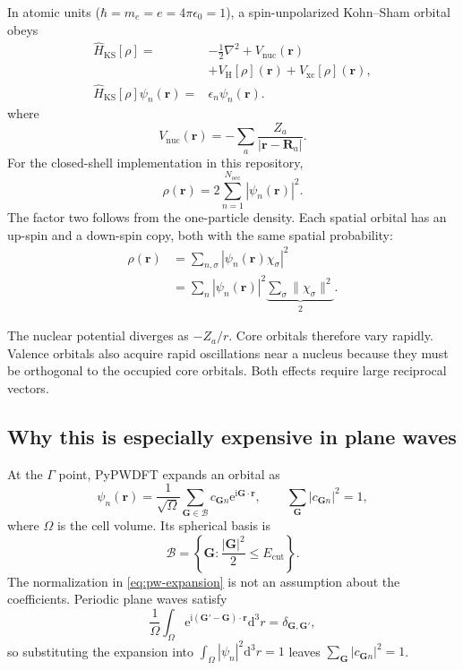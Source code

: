\documentclass[10pt,twocolumn]{article}
\newcommand{\ii}{\mathrm{i}}
\newcommand{\e}{\mathrm{e}}
\newcommand{\dd}{\mathrm{d}}
\newcommand{\gvec}{\mathbf G}
\newcommand{\rvec}{\mathbf r}
\newcommand{\Rvec}{\mathbf R}
\begin{document}
In atomic units (\(\hbar=m_e=e=4\pi\epsilon_0=1\)), a spin-unpolarized
Kohn--Sham orbital obeys
\begin{align}
\widehat H_{\mathrm{KS}}[\rho]
={}&-\frac{1}{2}\nabla^2+V_{\mathrm{nuc}}(\rvec)\nonumber\\
&+V_{\mathrm H}[\rho](\rvec)
+V_{\mathrm{xc}}[\rho](\rvec),\nonumber\\
\widehat H_{\mathrm{KS}}[\rho]\psi_n(\rvec)
={}&\epsilon_n\psi_n(\rvec).
\label{eq:ks-ae}
\end{align}
where
\begin{equation}
V_{\mathrm{nuc}}(\rvec)
=-\sum_a\frac{Z_a}{|\rvec-\Rvec_a|}.
\end{equation}
For the closed-shell implementation in this repository,
\begin{equation}
\rho(\rvec)=2\sum_{n=1}^{N_{\mathrm{occ}}}
|\psi_n(\rvec)|^2.
\end{equation}
The factor two follows from the one-particle density.  Each spatial orbital
has an up-spin and a down-spin copy, both with the same spatial probability:
\begin{align}
\rho(\rvec)
&=\sum_{n,\sigma}|\psi_n(\rvec)\chi_\sigma|^2\nonumber\\
&=\sum_n|\psi_n(\rvec)|^2
\underbrace{\sum_{\sigma}\|\chi_\sigma\|^2}_{2}.
\end{align}

The nuclear potential diverges as \(-Z_a/r\).  Core orbitals therefore vary
rapidly.  Valence orbitals also acquire rapid oscillations near a nucleus
because they must be orthogonal to the occupied core orbitals.  Both effects
require large reciprocal vectors.

\subsection{Why this is especially expensive in plane waves}

At the \(\Gamma\) point, PyPWDFT expands an orbital as
\begin{equation}
\psi_n(\rvec)=\frac{1}{\sqrt{\Omega}}
\sum_{\gvec\in\mathcal B}c_{\gvec n}\e^{\ii\gvec\cdot\rvec},
\qquad
\sum_{\gvec}|c_{\gvec n}|^2=1,
\label{eq:pw-expansion}
\end{equation}
where \(\Omega\) is the cell volume.  Its spherical basis is
\begin{equation}
\mathcal B=
\left\{\gvec:\frac{|\gvec|^2}{2}\le E_{\mathrm{cut}}\right\}.
\label{eq:cutoff}
\end{equation}
The normalization in \cref{eq:pw-expansion} is not an assumption about the
coefficients.  Periodic plane waves satisfy
\begin{equation}
\frac1\Omega\int_\Omega
\e^{\ii(\gvec'-\gvec)\cdot\rvec}\dd^3r
=\delta_{\gvec,\gvec'},
\end{equation}
so substituting the expansion into
\(\int_\Omega|\psi_n|^2\dd^3r=1\) leaves
\(\sum_\gvec|c_{\gvec n}|^2=1\).
\end{document}
